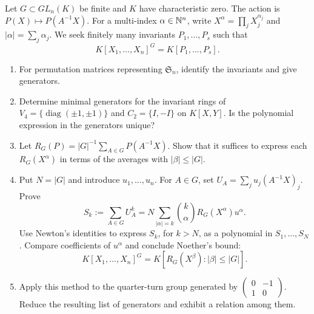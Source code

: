 \begin{exo}
\label{exo-action-polynomials}
Let $G\subset GL_n(K)$ be finite and $K$ have characteristic zero. The
action is $P(X)\mapsto P(A^{-1}X)$. For a multi-index
$\alpha\in\mathbb{N}^n$, write $X^\alpha=\prod_jX_j^{\alpha_j}$ and
$|\alpha|=\sum_j\alpha_j$. We seek finitely many invariants
$P_1,\ldots,P_s$ such that
\begin{equation}
\label{eq-defn-generation-ring-invariants}
 K[X_1,\ldots,X_n]^G=K[P_1,\ldots,P_s].
\end{equation}
\begin{enumerate}
\item For permutation matrices representing $\mathfrak S_n$, identify
the invariants and give generators.
\item Determine minimal generators for the invariant rings of
$V_4=\{\operatorname{diag}(\pm1,\pm1)\}$ and $C_2=\{I,-I\}$ on $K[X,Y]$.
Is the polynomial expression in the generators unique?
\item Let $R_G(P)=|G|^{-1}\sum_{A\in G}P(A^{-1}X)$. Show that it
suffices to express each $R_G(X^\alpha)$ in terms of the averages with
$|\beta|\leq|G|$.
\item Put $N=|G|$ and introduce $u_1,\ldots,u_n$. For $A\in G$, set
$U_A=\sum_j u_j(A^{-1}X)_j$. Prove
\[
 S_k:=\sum_{A\in G}U_A^k
       =N\sum_{|\alpha|=k}\binom{k}{\alpha}R_G(X^\alpha)u^\alpha.
\]
Use Newton's identities to express $S_k$, for $k>N$, as a polynomial
in $S_1,\ldots,S_N$. Compare coefficients of $u^\alpha$ and conclude
Noether's bound:
\[
 K[X_1,\ldots,X_n]^G=K[R_G(X^\beta):|\beta|\leq|G|].
\]
\item Apply this method to the quarter-turn group generated by
$\begin{pmatrix}0&-1\\1&0\end{pmatrix}$. Reduce the resulting list of
generators and exhibit a relation among them.
\end{enumerate}
\end{exo}



